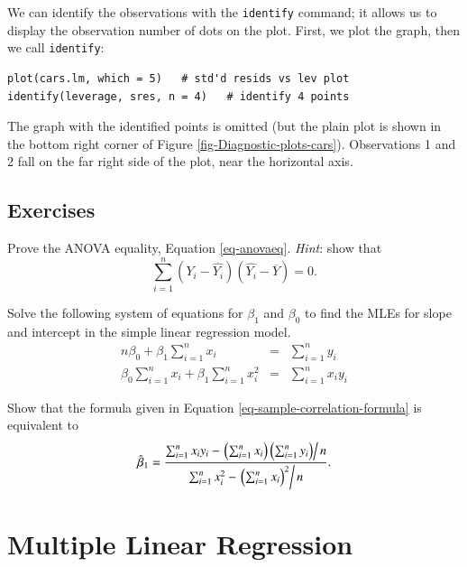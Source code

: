 \documentclass[captions=tableheading]{scrbook}
\begin{document}
We can identify the observations with the \texttt{identify} command; it allows us to display the observation number of dots on the plot. First, we plot the graph, then we call \texttt{identify}:


\begin{verbatim}
plot(cars.lm, which = 5)   # std'd resids vs lev plot
identify(leverage, sres, n = 4)   # identify 4 points
\end{verbatim}

The graph with the identified points is omitted (but the plain plot is shown in the bottom right corner of Figure \ref{fig-Diagnostic-plots-cars}). Observations 1 and 2 fall on the far right side of the plot, near the horizontal axis.

\newpage{}
\section{Exercises}
\label{sec-11-6}

\setcounter{thm}{0}

\begin{xca}
Prove the ANOVA equality, Equation \ref{eq-anovaeq}. \emph{Hint}:
show that
\[
\sum_{i=1}^{n}(Y_{i}-\hat{Y_{i}})(\hat{Y_{i}}-\overline{Y})=0.
\]
\end{xca}

\begin{xca}
Solve the following system of equations for \(\beta_{1}\) and \(\beta_{0}\) to find the MLEs for slope and intercept in the simple linear regression model.
\begin{eqnarray*}
n\beta_{0}+\beta_{1}\sum_{i=1}^{n}x_{i} & = & \sum_{i=1}^{n}y_{i}\\
\beta_{0}\sum_{i=1}^{n}x_{i}+\beta_{1}\sum_{i=1}^{n}x_{i}^{2} & = & \sum_{i=1}^{n}x_{i}y_{i}
\end{eqnarray*}
\end{xca}

\begin{xca}
Show that the formula given in Equation \ref{eq-sample-correlation-formula} is equivalent to
\[
\hat{\beta}_{1} = \frac{\sum_{i=1}^{n}x_{i}y_{i}-\left.\left(\sum_{i=1}^{n}x_{i}\right)\left(\sum_{i=1}^{n}y_{i}\right)\right/ n}{\sum_{i=1}^{n}x_{i}^{2}-\left.\left(\sum_{i=1}^{n}x_{i}\right)^{2}\right/ n}.
\]
\end{xca}
\chapter{Multiple Linear Regression}
\label{sec-12}
\label{cha-multiple-linear-regression}
\end{document}
